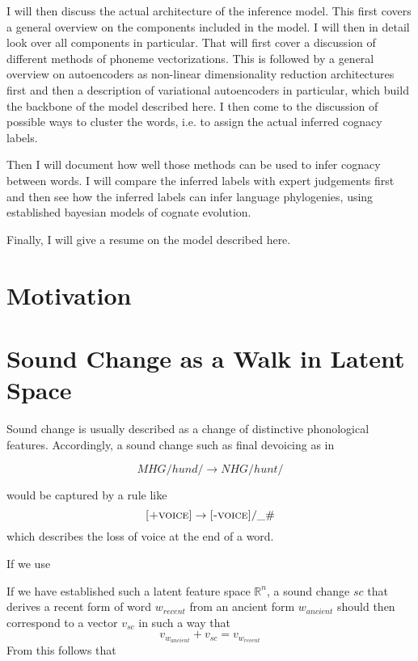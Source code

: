 \documentclass[8pt]{article}
\begin{document}
I will then discuss the actual architecture of the inference model. This first covers a general overview on the components included in the model. I will then in detail look over all components in particular. That will first cover a discussion of different methods of phoneme vectorizations. This is followed by a general overview on autoencoders as non-linear dimensionality reduction architectures first and then a description of variational autoencoders in particular, which build the backbone of the model described here. I then come to the discussion of possible ways to cluster the words, i.e. to assign the actual inferred cognacy labels.

Then I will document how well those methods can be used to infer cognacy between words. I will compare the inferred labels with expert judgements first and then see how the inferred labels can infer language phylogenies, using established bayesian models of cognate evolution.

Finally, I will give a resume on the model described here.

\section{Motivation}

\section{Sound Change as a Walk in Latent Space}
\label{Sound Change as a Walk in Latent Space}
Sound change is usually described as a change of distinctive phonological features.
Accordingly, a sound change such as final devoicing as in 

\begin{equation}
MHG /hund/ \rightarrow NHG /hunt/
\end{equation}

 would be captured by a rule like
\begin{equation}
\textsc{[+voice]} \rightarrow \textsc{[-voice]} / \_ \#
\label{eq:final_devoicing}
\end{equation}
which describes the loss of voice at the end of a word. 


If we use 

If we have established such a latent feature space $\mathbb{R}^n$, a sound change $sc$ that derives a recent form of word $w_{recent}$ from an ancient form  $w_{ancient}$ should then correspond to a vector $v_{sc}$ in such a way that 
\begin{equation}
v_{w_{ancient}}+v_{sc} = v_{w_{recent}}
\end{equation}
From this follows that 
\end{document}
